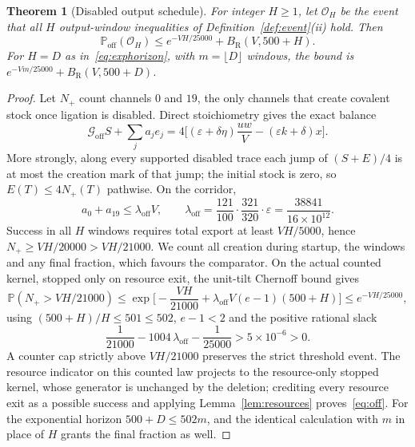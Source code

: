 \documentclass[11pt,a4paper]{article}
\theoremstyle{plain}
\newtheorem{theorem}{Theorem}[section]
\theoremstyle{definition}
\theoremstyle{remark}
\newcommand{\Prob}{\mathbb P}
\newcommand{\G}{\mathcal G}
\newcommand{\eps}{\varepsilon}
\newcommand{\BR}{B_{\mathrm R}}
\newcommand{\Ooff}{\mathcal O}
\newcommand{\Poff}{\Prob_{\mathrm{off}}}
\begin{document}
\begin{theorem}[Disabled output schedule]\label{thm:disabled}
For integer $H\ge1$, let $\Ooff_H$ be the event that all $H$ output-window inequalities of Definition~\ref{def:event}(ii) hold. Then
\begin{equation}\label{eq:off}
 \Poff(\Ooff_H)\le e^{-VH/25000}+\BR(V,500+H).
\end{equation}
For $H=D$ as in~\eqref{eq:exphorizon}, with $m=\lfloor D\rfloor$ windows, the bound is $e^{-Vm/25000}+\BR(V,500+D)$.
\end{theorem}
\begin{proof}
Let $N_+$ count channels $0$ and $19$, the only channels that create covalent stock once ligation is disabled. Direct stoichiometry gives the exact balance
\begin{equation}\label{eq:offbalance}
 \G_{\mathrm{off}}S+\sum_ja_je_j=4\Big[(\eps+\delta\eta)\frac{uw}V-(\eps k+\delta)x\Big].
\end{equation}
More strongly, along every supported disabled trace each jump of $(S+E)/4$ is at most the creation mark of that jump; the initial stock is zero, so $E(T)\le4N_+(T)$ pathwise. On the corridor,
\[
 a_0+a_{19}\le\lambda_{\mathrm{off}}V,\qquad\lambda_{\mathrm{off}}=\frac{121}{100}\cdot\frac{321}{320}\cdot\eps=\frac{38841}{16\times10^{12}}.
\]
Success in all $H$ windows requires total export at least $VH/5000$, hence $N_+\ge VH/20000>VH/21000$. We count all creation during startup, the windows and any final fraction, which favours the comparator. On the actual counted kernel, stopped only on resource exit, the unit-tilt Chernoff bound gives
\[
 \Prob(N_+>VH/21000)\le\exp\Big[-\frac{VH}{21000}+\lambda_{\mathrm{off}}V(e-1)(500+H)\Big]\le e^{-VH/25000},
\]
using $(500+H)/H\le501\le502$, $e-1<2$ and the positive rational slack
\begin{equation}\label{eq:offslack}
 \frac1{21000}-1004\,\lambda_{\mathrm{off}}-\frac1{25000}>5\times10^{-6}>0 .
\end{equation}
A counter cap strictly above $VH/21000$ preserves the strict threshold event. The resource indicator on this counted law projects to the resource-only stopped kernel, whose generator is unchanged by the deletion; crediting every resource exit as a possible success and applying Lemma~\ref{lem:resources} proves~\eqref{eq:off}. For the exponential horizon $500+D\le502m$, and the identical calculation with $m$ in place of $H$ grants the final fraction as well.
\end{proof}
\end{document}
